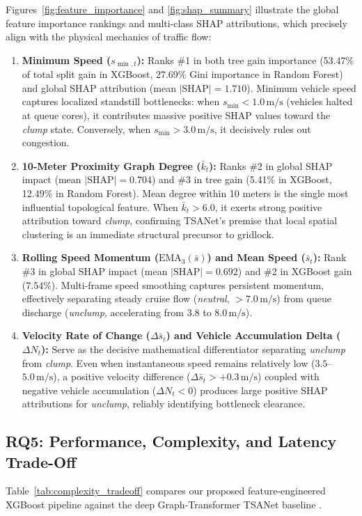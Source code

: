 \documentclass[conference]{IEEEtran}
\begin{document}
Figures~\ref{fig:feature_importance} and \ref{fig:shap_summary} illustrate the global feature importance rankings and multi-class SHAP attributions, which precisely align with the physical mechanics of traffic flow:
\begin{enumerate}
    \item \textbf{Minimum Speed ($s_{\min, t}$):} Ranks \#1 in both tree gain importance (53.47\% of total split gain in XGBoost, 27.69\% Gini importance in Random Forest) and global SHAP attribution (mean $|\text{SHAP}| = 1.710$). Minimum vehicle speed captures localized standstill bottlenecks: when $s_{\min} < 1.0\,\text{m/s}$ (vehicles halted at queue cores), it contributes massive positive SHAP values toward the \textit{clump} state. Conversely, when $s_{\min} > 3.0\,\text{m/s}$, it decisively rules out congestion.
    \item \textbf{10-Meter Proximity Graph Degree ($\bar{k}_t$):} Ranks \#2 in global SHAP impact (mean $|\text{SHAP}| = 0.704$) and \#3 in tree gain (5.41\% in XGBoost, 12.49\% in Random Forest). Mean degree within 10 meters is the single most influential topological feature. When $\bar{k}_t > 6.0$, it exerts strong positive attribution toward \textit{clump}, confirming TSANet's premise that local spatial clustering is an immediate structural precursor to gridlock.
    \item \textbf{Rolling Speed Momentum ($\text{EMA}_3(\bar{s})$) and Mean Speed ($\bar{s}_t$):} Rank \#3 in global SHAP impact (mean $|\text{SHAP}| = 0.692$) and \#2 in XGBoost gain (7.54\%). Multi-frame speed smoothing captures persistent momentum, effectively separating steady cruise flow (\textit{neutral}, $> 7.0\,\text{m/s}$) from queue discharge (\textit{unclump}, accelerating from $3.8$ to $8.0\,\text{m/s}$).
    \item \textbf{Velocity Rate of Change ($\Delta \bar{s}_t$) and Vehicle Accumulation Delta ($\Delta N_t$):} Serve as the decisive mathematical differentiator separating \textit{unclump} from \textit{clump}. Even when instantaneous speed remains relatively low ($3.5$--$5.0\,\text{m/s}$), a positive velocity difference ($\Delta \bar{s}_t > +0.3\,\text{m/s}$) coupled with negative vehicle accumulation ($\Delta N_t < 0$) produces large positive SHAP attributions for \textit{unclump}, reliably identifying bottleneck clearance.
\end{enumerate}

\subsection{RQ5: Performance, Complexity, and Latency Trade-Off}
Table~\ref{tab:complexity_tradeoff} compares our proposed feature-engineered XGBoost pipeline against the deep Graph-Transformer TSANet baseline \cite{kumar2024tsanet}.
\end{document}
